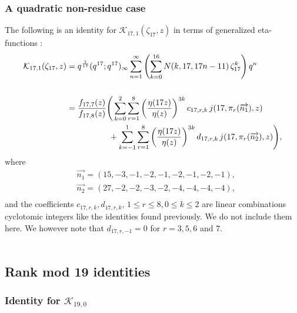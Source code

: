 \documentclass[12pt]{amsart}
\theoremstyle{definition}
\theoremstyle{remark}
\numberwithin{equation}{section}
\newcommand\Lpar[1]{\left(#1\right)}
\begin{document}
\subsubsection{\textbf{A quadratic non-residue case}}
The following is an identity for $\mathcal{K}_{17,1}(\zeta_{17},z)$ in terms of generalized eta-functions :
\\
\begin{align}
\mathcal{K}_{17,1}(\zeta_{17},z)&=q^{\frac{1}{17}}(q^{17};q^{17})_\infty \sum_{n=1}^\infty \Lpar{\sum_{k=0}^{16} N(k,17,17n-11)\,\zeta_{17}^k}q^n \label{eq:rank17id3} \\
\nonumber
\\
&=\frac{f_{17,7}(z)}{f_{17,8}(z)}\Bigg(\sum_{k=0}^{2}\sum_{r=1}^{8} \left(\dfrac{\eta(17z)}{\eta(z)}\right)^{3k}c_{17,r,k}\,j(17,\pi_r(\overrightarrow{n_1}),z)
\nonumber
\\
&\hspace{18mm}+\sum_{k=-1}^{1}\sum_{r=1}^{8} \left(\dfrac{\eta(17z)}{\eta(z)}\right)^{3k}d_{17,r,k}\,j(17,\pi_r(\overrightarrow{n_2}),z)\Bigg),
\nonumber
\end{align}
where
\begin{align*}
&\overrightarrow{n_1}=(15,-3,-1,-2,-1,-2,-1,-2,-1),
\\
&\overrightarrow{n_2}=(27,-2,-2,-3,-2,-4,-4,-4,-4),\\
\end{align*}
and the coefficients $c_{17,r,k}, d_{17,r,k}$, $1\leq r \leq 8, 0\leq k \leq 2$ are linear combinations cyclotomic integers like the identities found previously. We do not include them here. We however note that $d_{17,r,-1}=0$ for $r=3,5,6$ and  $7$.\\\\




\subsection{Rank mod 19 identities}
\label{subsec:mod19}

\subsubsection{\textbf{Identity for $\mathcal{K}_{19,0}$}}
\end{document}
